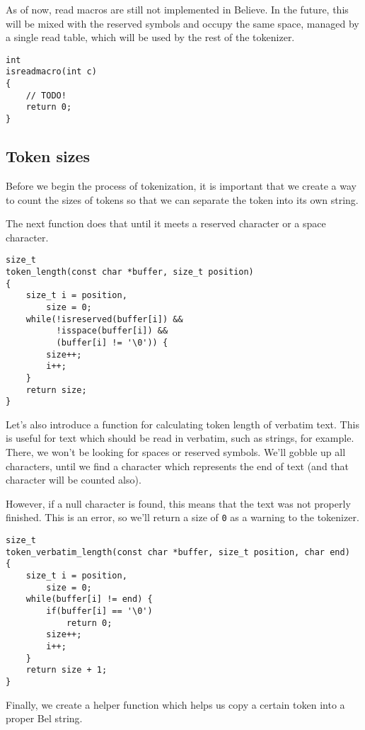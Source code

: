 \documentclass[openright,a4paper,twoside,12pt]{memoir}
\begin{document}
As of  now, read macros are  still not implemented in  Believe. In the
future, this  will be mixed with  the reserved symbols and  occupy the
same space, managed by a single read  table, which will be used by the
rest of the tokenizer.

\begin{verbatim}
int
isreadmacro(int c)
{
    // TODO!
    return 0;
}
\end{verbatim}

\subsection{Token sizes}
\label{sec:org013a4fe}

Before we begin  the process of tokenization, it is  important that we
create a way to count the sizes  of tokens so that we can separate the
token into its own string.

The next function  does that until it meets a  reserved character or a
space character.

\begin{verbatim}
size_t
token_length(const char *buffer, size_t position)
{
    size_t i = position,
        size = 0;
    while(!isreserved(buffer[i]) &&
          !isspace(buffer[i]) &&
          (buffer[i] != '\0')) {
        size++;
        i++;
    }
    return size;
}
\end{verbatim}

Let's  also  introduce a  function  for  calculating token  length  of
verbatim  text. This  is  useful  for text  which  should  be read  in
verbatim, such as strings, for example. There, we won't be looking for
spaces or reserved  symbols. We'll gobble up all  characters, until we
find a character which represents the  end of text (and that character
will be counted also).

However, if  a null character is  found, this means that  the text was
not properly finished. This  is an error, so we'll return  a size of \texttt{0}
as a warning to the tokenizer.

\begin{verbatim}
size_t
token_verbatim_length(const char *buffer, size_t position, char end)
{
    size_t i = position,
        size = 0;
    while(buffer[i] != end) {
        if(buffer[i] == '\0')
            return 0;
        size++;
        i++;
    }
    return size + 1;
}
\end{verbatim}

Finally, we  create a helper  function which  helps us copy  a certain
token into a proper Bel string.
\end{document}
